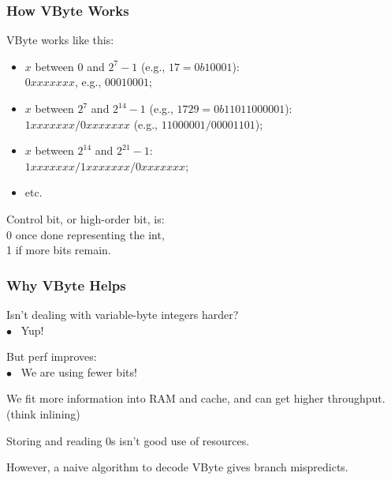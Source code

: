 \begin{frame}
\frametitle{How VByte Works}


VByte works like this:

\begin{itemize}
\item $x$ between 0 and $2^7-1$ (e.g., $17 = 0b10001$):\\
\hspace*{1em}$0xxx xxxx$, e.g., $0001 0001$;
\item $x$ between $2^7$ and $2^{14}-1$ (e.g., $1729 = 0b110 11000001$):\\
\hspace*{1em}                   $1xxx xxxx/0xxx xxxx$ (e.g., $1100 0001/0000 1101$);\\
\item $x$ between $2^{14}$ and $2^{21}-1$: \\
\hspace*{1em}$1xxx xxxx/1xxx xxxx/0xxx xxxx$;
\item etc.
\end{itemize}

Control bit, or high-order bit, is:\\
\hspace*{2em}0 once done representing the int,\\
\hspace*{2em}1 if more bits remain.


\end{frame}



\begin{frame}
\frametitle{Why VByte Helps}


Isn't dealing with variable-byte integers harder?\\
\hspace*{2em} $\bullet$~ Yup!

But perf improves: \\
\hspace*{2em} $\bullet$~ We are using fewer bits! 

We fit more information into RAM and
cache, and can get higher throughput. \\
\qquad (think inlining)

Storing and reading 0s isn't good use of resources. 

However, a naive algorithm to decode VByte
gives branch mispredicts.

\end{frame}

